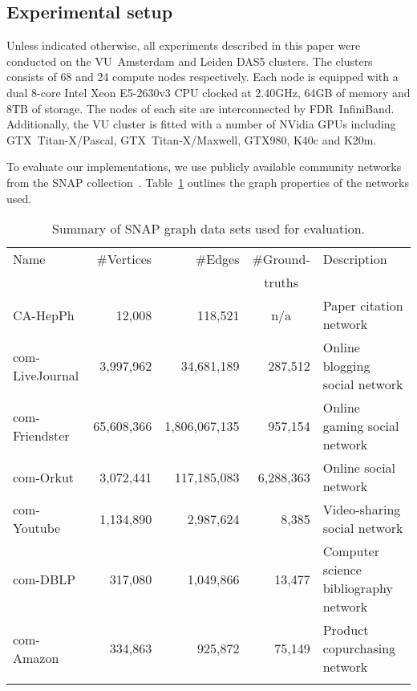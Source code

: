 \subsection{Experimental setup}
\label{sec-experimental}

Unless indicated otherwise, all experiments described in this paper
were conducted on the VU~Amsterdam and Leiden DAS5 clusters.  The clusters
consists of 68 and 24 compute nodes respectively. Each node is equipped with
a dual 8-core Intel Xeon E5-2630v3 CPU clocked at 2.40GHz, 64GB of memory and
8TB of storage. The nodes of each site are interconnected by FDR~InfiniBand.
Additionally, the VU cluster is fitted with a number of NVidia GPUs including
GTX~\mbox{Titan-X/Pascal},
GTX~\mbox{Titan-X/Maxwell}, GTX980, K40c and K20m.

To evaluate our implementations, we use publicly available
community networks from the SNAP collection~\cite{snapnets}.
Table~\ref{table-snap}
outlines the graph properties of the networks used.

\begin{table}
  \centering
  \def\tabcolsep{0.2em}
  \begin{tabular}{l r r r p{9em}}
    Name            & \#Vertices &       \#Edges & \multicolumn{1}{c}{\#Ground-} & Description \\
                    &            &               & \multicolumn{1}{c}{truths}    &             \\
    \hline
    CA-HepPh        &    12,008  &    118,521    & \multicolumn{1}{c}{n/a}       & Paper citation network \\
    com-LiveJournal &  3,997,962 &    34,681,189 & 287,512        & Online blogging social network \\
    com-Friendster  & 65,608,366 & 1,806,067,135 & 957,154        & Online gaming social network \\
    com-Orkut       &  3,072,441 &   117,185,083 & 6,288,363      & Online social network \\
    com-Youtube     &  1,134,890 &     2,987,624 & 8,385          & Video-sharing social network \\
    com-DBLP        &    317,080 &     1,049,866 & 13,477         & Computer science bibliography network \\
    com-Amazon      &    334,863 &       925,872 & 75,149         & Product copurchasing network \\
    \hline
    \\[-1ex]
  \end{tabular}
  \caption{Summary of SNAP graph data sets used for evaluation.}
  \label{table-snap}
\end{table}

